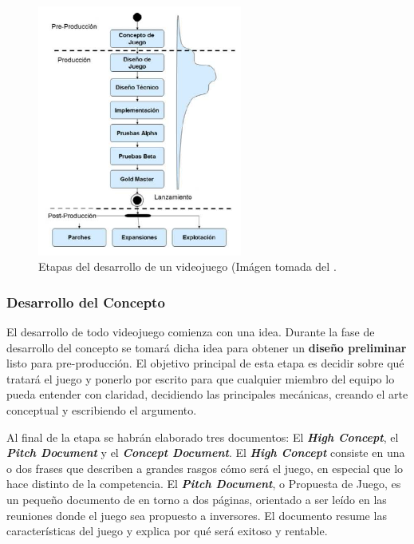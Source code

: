 \begin{figure}[h]
    \centering
    \includegraphics[width=0.6\textwidth]{images/estadodelarte/desarrollo/etapas-desarrollo}
    \caption{Etapas del desarrollo de un videojuego (Imágen tomada del \cite{libro_esi}.}
    \label{etapas-desarrollo}
\end{figure}

\subsubsection{Desarrollo del Concepto}
El desarrollo de todo videojuego comienza con una idea. Durante la fase de desarrollo del concepto se tomará dicha idea para obtener un \textbf{diseño preliminar} listo para pre-producción. El objetivo principal de esta etapa es decidir sobre qué tratará el juego y ponerlo por escrito para que cualquier miembro del equipo lo pueda entender con claridad, decidiendo las principales mecánicas, creando el arte conceptual y escribiendo el argumento\cite{game_design_2}. 

Al final de la etapa se habrán elaborado tres documentos: El \textbf{\textit{High Concept}}, el \textbf{\textit{Pitch Document}} y el \textbf{\textit{Concept Document}}. El \textbf{\textit{High Concept}} consiste en una o dos frases que describen a grandes rasgos cómo será el juego, en especial que lo hace distinto de la competencia. El \textbf{\textit{Pitch Document}}, o Propuesta de Juego, es un pequeño documento de en torno a dos páginas, orientado a ser leído en las reuniones donde el juego sea propuesto a inversores. El documento resume las características del juego y explica por qué será exitoso y rentable.

